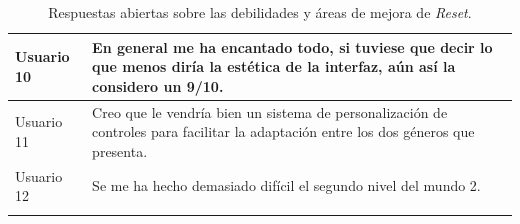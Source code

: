 \begin{longtable}{|l|p{13.5cm}|}
Usuario 10 & En general me ha encantado todo, si tuviese que decir lo que menos diría la estética de la interfaz, aún así la considero un 9/10. \\ \hline
Usuario 11 & Creo que le vendría bien un sistema de personalización de controles para facilitar la adaptación entre los dos géneros que presenta. \\ \hline
Usuario 12 & Se me ha hecho demasiado difícil el segundo nivel del mundo 2. \\ \hline
\caption{Respuestas abiertas sobre las debilidades y áreas de mejora de \textit{Reset}.}
\label{tab:comentarios_menos_gustado}
\end{longtable}
